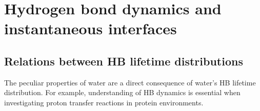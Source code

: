 \chapter{Hydrogen bond dynamics and instantaneous interfaces}
\section{Relations between HB lifetime distributions}\label{relation_hbd}
The peculiar properties of water are a direct consequence of water's HB lifetime distribution\cite{Lee2007,Sciortino1989,Sciortino1990prl}.
For example, understanding of HB dynamics is essential when investigating proton transfer reactions in protein environments\cite{Ishikita2013}.  
